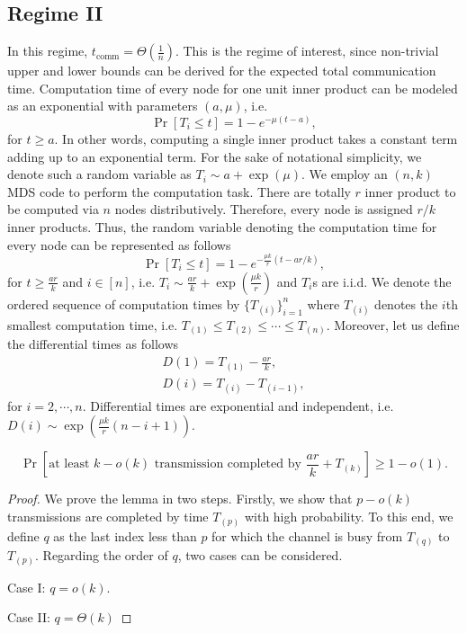 \documentclass[onecolumn,journal,twoside]{IEEEtran}
\begin{document}
\subsection{Regime II}
In this regime, $t_{\text{comm}}=\Theta(\frac{1}{n})$. This is the regime of interest, since non-trivial upper and lower bounds can be derived for the expected total communication time. Computation time of every node for one unit inner product can be modeled as an exponential with parameters $(a,\mu)$, i.e.
\begin{equation}
\Pr[T_i\leq t] = 1-e^{-\mu(t-a)},
\end{equation}
for $t\geq a$. In other words, computing a single inner product takes a constant term adding up to an exponential term. For the sake of notational simplicity, we denote such a random variable as $T_i \sim a+\exp(\mu)$. We employ an $(n,k)$ MDS code to perform the computation task. There are totally $r$ inner product to be computed via $n$ nodes distributively. Therefore, every node is assigned $r/k$ inner products. Thus, the random variable denoting the computation time for every node can be represented as follows 
\begin{equation}
\Pr[T_i\leq t] = 1-e^{-\frac{\mu k}{r}(t-ar/k)},
\end{equation}
for $t\geq \frac{ar}{k}$ and $i \in [n]$, i.e. $T_i \sim \frac{ar}{k} + \exp(\frac{\mu k}{r})$ and $T_i$s are i.i.d. We denote the ordered sequence of computation times by $\{T_{(i)}\}_{i=1}^n$  where $T_{(i)}$ denotes the $i$th smallest computation time, i.e. $T_{(1)} \leq T_{(2)} \leq \cdots \leq T_{(n)}$. Moreover, let us define the differential times as follows 
\begin{align}
D(1) = T_{(1)} - \frac{ar}{k},\\
D(i) = T_{(i)} - T_{(i-1)},
\end{align}
for $i=2,\cdots,n$. Differential times are exponential and independent, i.e. $D(i) \sim \exp(\frac{\mu k}{r}(n-i+1))$. 



\begin{lemma}
\begin{equation}
\Pr[ \text{at least  $k-o(k)$ transmission completed by $\frac{ar}{k}+T_{(k)}$}] \geq 1-o(1). 
\end{equation}
\end{lemma}
\begin{proof}
We prove the lemma in two steps. Firstly, we show that $p-o(k)$ transmissions are completed by time $T_{(p)}$ with high probability. To this end, we define $q$ as the last index less than $p$ for which the channel is busy from $T_{(q)}$ to $T_{(p)}$. Regarding the order of $q$, two cases can be considered.

Case I: $q=o(k)$. 


Case II: $q=\Theta(k)$
\end{proof}
\end{document}
